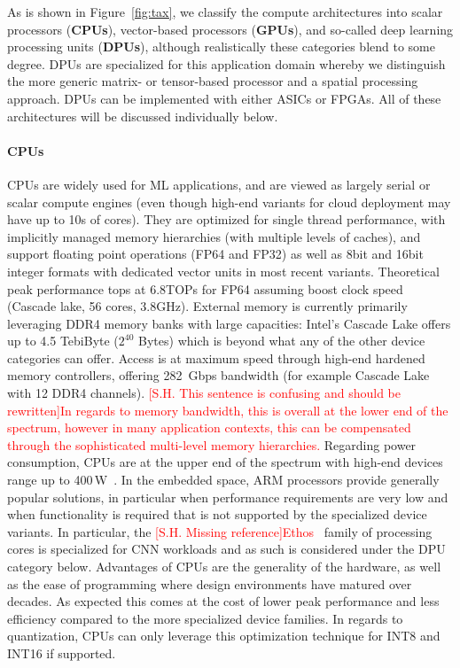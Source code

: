 As is shown in Figure~\ref{fig:tax}, we classify the compute architectures into scalar processors (\textbf{CPUs}), vector-based processors (\textbf{GPUs}), and so-called deep learning processing units (\textbf{DPUs}), although realistically these categories blend to some degree. 
DPUs are specialized for this application domain whereby we distinguish the more generic matrix- or tensor-based processor and a spatial processing approach. DPUs can be implemented with either ASICs or FPGAs. All of these architectures will be discussed individually below.

\paragraph*{CPUs} CPUs are widely used for ML applications, and are viewed as largely serial or scalar compute engines (even though high-end variants for cloud deployment may have up to 10s of cores). They are optimized for single thread performance, with implicitly managed memory hierarchies (with multiple levels of caches), and support floating point operations (FP64 and FP32) as well as 8bit and 16bit integer formats with dedicated vector units in most recent variants. Theoretical peak performance tops at 6.8TOPs for FP64 assuming boost clock speed (Cascade lake, 56 cores, 3.8GHz). External memory is currently primarily leveraging DDR4 memory banks with large capacities: Intel's Cascade Lake offers up to 4.5 TebiByte ($2^{40}$ Bytes) which is beyond what any of the other device categories can offer. Access is at maximum speed through high-end hardened memory controllers, offering 282~Gbps bandwidth (for example Cascade Lake with 12 DDR4 channels). 
\textcolor{red}{[S.H. This sentence is confusing and should be rewritten]In regards to memory bandwidth, this is overall at the lower end of the spectrum, however in many application contexts, this can be compensated through the sophisticated multi-level memory hierarchies.}
Regarding power consumption, CPUs are at the upper end of the spectrum with high-end devices range up to 400\,W~\cite{cascadelake}.
In the embedded space, ARM processors provide generally popular solutions, in particular when performance requirements are very low and when functionality is required that is not supported by the specialized device variants. In particular, the \textcolor{red}{[S.H. Missing reference]Ethos~\cite{} }family of processing cores is specialized for CNN workloads and as such is considered under the DPU category below.
Advantages of CPUs are the generality of the hardware, as well as the ease of programming where design environments have matured over decades. 
As expected this comes at the cost of lower peak performance and less efficiency compared to the more specialized device families.
In regards to quantization, CPUs can only leverage this optimization technique for INT8 and INT16 if supported.

